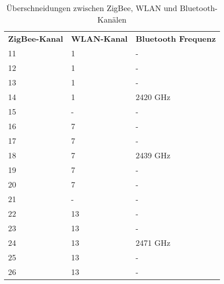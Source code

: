                 \begin{table}
                    \begin{tabular}{lll}
                        \textbf{ZigBee-Kanal} & \textbf{WLAN-Kanal} & \textbf{Bluetooth Frequenz} \\
                        11           & 1          & -\\
                        12           & 1          & -\\
                        13           & 1          & -\\
                        14           & 1          & 2420 GHz\\
                        15           & -          & -\\
                        16           & 7          & -\\
                        17           & 7          & -\\
                        18           & 7          & 2439 GHz\\
                        19           & 7          & -\\
                        20           & 7          & -\\
                        21           & -          & -\\
                        22           & 13         & -\\
                        23           & 13         & -\\
                        24           & 13         & 2471 GHz\\
                        25           & 13         & -\\
                        26           & 13         & -\\
                    \end{tabular}
                    \label{zigbee_wlan_kanäle}
                    \caption{Überschneidungen zwischen ZigBee, WLAN und Bluetooth-Kanälen}
                \end{table}

